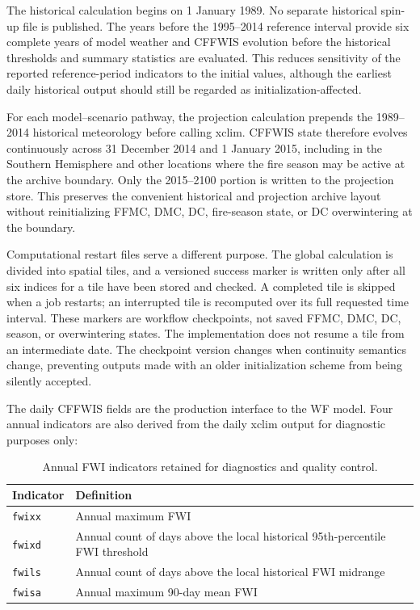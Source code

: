 \documentclass[11pt]{article}
\begin{document}
The historical calculation begins on 1 January 1989. No separate historical
spin-up file is published. The years before the 1995--2014 reference interval
provide six complete years of model weather and CFFWIS evolution before the
historical thresholds and summary statistics are evaluated. This reduces
sensitivity of the reported reference-period indicators to the initial values,
although the earliest daily historical output should still be regarded as
initialization-affected.

For each model--scenario pathway, the projection calculation prepends the
1989--2014 historical meteorology before calling xclim. CFFWIS state therefore
evolves continuously across 31 December 2014 and 1 January 2015, including in
the Southern Hemisphere and other locations where the fire season may be active
at the archive boundary. Only the 2015--2100 portion is written to the
projection store. This preserves the convenient historical and projection
archive layout without reinitializing FFMC, DMC, DC, fire-season state, or DC
overwintering at the boundary.

Computational restart files serve a different purpose. The global calculation
is divided into spatial tiles, and a versioned success marker is written only after all
six indices for a tile have been stored and checked. A completed tile is skipped
when a job restarts; an interrupted tile is recomputed over its full requested
time interval. These markers are workflow checkpoints, not saved FFMC, DMC, DC,
season, or overwintering states. The implementation does not resume a tile from
an intermediate date. The checkpoint version changes when continuity semantics
change, preventing outputs made with an older initialization scheme from being
silently accepted.

The daily CFFWIS fields are the production interface to the WF model. Four
annual indicators are also derived from the daily xclim output for diagnostic
purposes only:

\begin{table}[htbp]
\centering
\caption{Annual FWI indicators retained for diagnostics and quality control.}
\label{tab:fwi-diagnostics}
\small
\begin{tabularx}{\textwidth}{lX}
\toprule
Indicator & Definition \\
\midrule
\texttt{fwixx} & Annual maximum FWI \\
\texttt{fwixd} & Annual count of days above the local historical
95th-percentile FWI threshold \\
\texttt{fwils} & Annual count of days above the local historical FWI midrange \\
\texttt{fwisa} & Annual maximum 90-day mean FWI \\
\bottomrule
\end{tabularx}
\end{table}
\end{document}
